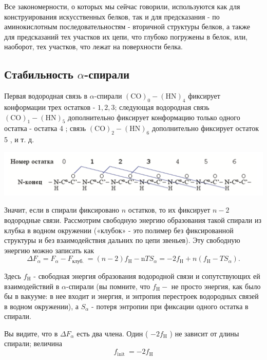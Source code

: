 \documentclass[
11pt,%
tightenlines,%
twoside,%
onecolumn,%
nofloats,%
nobibnotes,%
nofootinbib,%
superscriptaddress,%
noshowpacs,%
centertags]%
{revtex4}
\begin{document}
Все закономерности, о которых мы сейчас говорили, используются как для конструирования искусственных белков, так и для предсказания - по аминокислотным последовательностям - вторичной структуры белков, а также для предсказаний тех участков их цепи, что глубоко погружены в белок, или, наоборот, тех участков, что лежат на поверхности белка.

\newpage
\subsection{Стабильность $\alpha$-спирали}
Первая водородная связь в $\alpha$-спирали $(\mathrm{CO})_0-(\mathrm{HN})_4$ фиксирует конформации трех остатков - $1,2,3$; следующая водородная связь $(\mathrm{CO})_1-(\mathrm{HN})_5$ дополнительно фиксирует конформацию только одного остатка - остатка 4 ; связь $(\mathrm{CO})_2-(\mathrm{HN})_6$ дополнительно фиксирует остаток 5 , и т. д.

\includegraphics[width=\textwidth]{ostatok}

Значит, если в спирали фиксировано $n$ остатков, то их фиксирует $n-2$ водородные связи. Рассмотрим свободную энергию образования такой спирали из клубка в водном окружении («клубок» - это полимер без фиксированной структуры и без взаимодействия дальних по цепи звеньев). Эту свободную энергию можно записать как
\begin{equation}
	\Delta F_\alpha=F_\alpha-F_{\text {клуб. }}=(n-2) f_{\mathrm{H}}-\mathrm{n} T S_\alpha=-2 f_{\mathrm{H}}+n\left(f_{\mathrm{H}}-T S_\alpha\right) .
\end{equation}

Здесь $f_{\mathrm{H}}$ - свободная энергия образования водородной связи и сопутствующих ей взаимодействий в $\alpha$-спирали (вы помните, что $f_{\mathrm{H}}-$ не просто энергия, как было бы в вакууме: в нее входит и энергия, и энтропия перестроек водородных связей в водном окружении), а $S_\alpha$ - потеря энтропии при фиксации одного остатка в спирали.

Вы видите, что в $\Delta F_\alpha$ есть два члена. Один ( $-2 f_{\mathrm{H}}$ ) не зависит от длины спирали; величина
\begin{equation}
	f_{\text {init }}=-2 f_{\mathrm{H}}
\end{equation}
\end{document}
